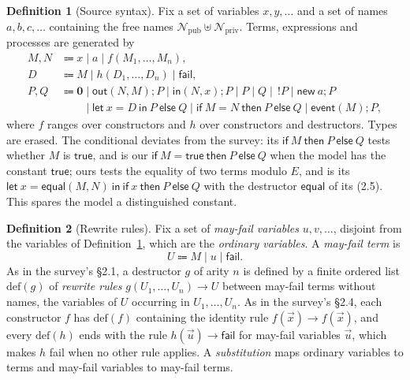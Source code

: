 \documentclass[11pt]{article}
\theoremstyle{definition}
\newtheorem{definition}{Definition}[section]
\theoremstyle{plain}
\theoremstyle{remark}
\begin{document}
\begin{definition}[Source syntax]\label{def:syntax}
Fix a set of variables $x,y,\dots$ and a set of names $a,b,c,\dots$ containing the free names $\mathcal{N}_{\mathrm{pub}}\uplus\mathcal{N}_{\mathrm{priv}}$. Terms, expressions and processes are generated by
\begin{align*}
M,N &\Coloneqq x\mid a\mid f(M_1,\dots,M_n),\\
D &\Coloneqq M\mid h(D_1,\dots,D_n)\mid\mathsf{fail},\\
P,Q &\Coloneqq \mathbf{0}\mid \mathsf{out}(N,M);P\mid \mathsf{in}(N,x);P\mid P\mid Q\mid\,!P\mid\mathsf{new}\ a;P\\
&\qquad\mid \mathsf{let}\ x=D\ \mathsf{in}\ P\ \mathsf{else}\ Q\mid \mathsf{if}\ M=N\ \mathsf{then}\ P\ \mathsf{else}\ Q\mid \mathsf{event}(M);P,
\end{align*}
where $f$ ranges over constructors and $h$ over constructors and destructors. Types are erased. The conditional deviates from the survey: its $\mathsf{if}\ M\ \mathsf{then}\ P\ \mathsf{else}\ Q$ tests whether $M$ is $\mathsf{true}$, and is our $\mathsf{if}\ M=\mathsf{true}\ \mathsf{then}\ P\ \mathsf{else}\ Q$ when the model has the constant $\mathsf{true}$; ours tests the equality of two terms modulo $E$, and is its $\mathsf{let}\ x=\mathsf{equal}(M,N)\ \mathsf{in}\ \mathsf{if}\ x\ \mathsf{then}\ P\ \mathsf{else}\ Q$ with the destructor $\mathsf{equal}$ of its (2.5). This spares the model a distinguished constant.
\end{definition}

\begin{definition}[Rewrite rules]\label{def:rewrite}
Fix a set of \textit{may-fail variables} $u,v,\dots$, disjoint from the variables of Definition~\ref{def:syntax}, which are the \textit{ordinary variables}. A \textit{may-fail term} is
\[
U\Coloneqq M\mid u\mid\mathsf{fail}.
\]
As in the survey's \S2.1, a destructor $g$ of arity $n$ is defined by a finite ordered list $\mathrm{def}(g)$ of \textit{rewrite rules} $g(U_1,\dots,U_n)\to U$ between may-fail terms without names, the variables of $U$ occurring in $U_1,\dots,U_n$. As in the survey's \S2.4, each constructor $f$ has $\mathrm{def}(f)$ containing the identity rule $f(\vec x)\to f(\vec x)$, and every $\mathrm{def}(h)$ ends with the rule $h(\vec u)\to\mathsf{fail}$ for may-fail variables $\vec u$, which makes $h$ fail when no other rule applies. A \textit{substitution} maps ordinary variables to terms and may-fail variables to may-fail terms.
\end{definition}
\end{document}
